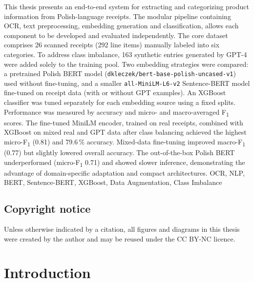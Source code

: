 \documentclass{SGGW-thesis-EN}
\begin{document}
{This thesis presents an end-to-end system for extracting and categorizing product information from Polish-language receipts. 
The modular pipeline containing OCR, text preprocessing, embedding generation and classification, allows each component to be developed and evaluated independently. 
The core dataset comprises 26 scanned receipts (292 line items) manually labeled into six categories. 
To address class imbalance, 163 synthetic entries generated by GPT-4 were added solely to the training pool.
Two embedding strategies were compared: a pretrained Polish BERT model (\texttt{dkleczek/bert-base-polish-uncased-v1}) used without fine-tuning, 
and a smaller \texttt{all-MiniLM-L6-v2} Sentence-BERT model fine-tuned on receipt data (with or without GPT examples). 
An XGBoost classifier was tuned separately for each embedding source using a fixed splits. 
Performance was measured by accuracy and micro- and macro-averaged F\textsubscript{1} scores.
The fine-tuned MiniLM encoder, trained on real receipts, combined with XGBoost on mixed real and GPT data after class balancing achieved the highest 
micro-F\textsubscript{1} (0.81) and 79.6\,\% accuracy. Mixed-data fine-tuning improved macro-F\textsubscript{1} (0.77) but slightly lowered overall accuracy. 
The out-of-the-box Polish BERT underperformed (micro-F\textsubscript{1} 0.71) and showed slower inference, 
demonstrating the advantage of domain-specific adaptation and compact architectures.}
{OCR, NLP, BERT, Sentence-BERT, XGBoost, Data Augmentation, Class Imbalance}


\tableofcontents

\section*{Copyright notice}
\noindent
Unless otherwise indicated by a citation, all figures and diagrams in this thesis were created by the author and may be reused under the CC BY-NC licence.


\startchapterfromoddpage %

\chapter{Introduction}
\end{document}
